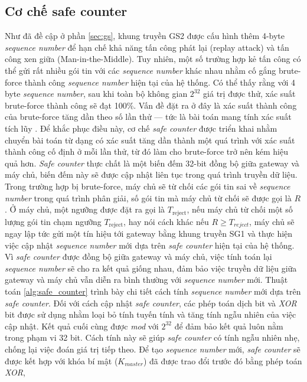 \subsection{Cơ chế safe counter}
\label{sec:safe_counter}
Như đã đề cập ở phần \ref{sec:gs}, khung truyền GS2 được cấu hình thêm 4-byte \textit{sequence number} để hạn chế khả năng tấn công phát lại (replay attack) và tấn công xen giữa (Man-in-the-Middle). Tuy nhiên, một số trường hợp kẻ tấn công có thể gửi rất nhiều gói tin với các \textit{sequence number} khác nhau nhằm cố gắng brute-force thành công \textit{sequence number} hiện tại của hệ thống. Có thể thấy rằng với 4 byte \textit{sequence number}, sau khi toàn bộ không gian $2^{32}$ giá trị được thử, xác suất brute-force thành công sẽ đạt 100\%. Vấn đề đặt ra ở đây là xác suất thành công của brute-force tăng dần theo số lần thử — tức là bài toán mang tính xác suất tích lũy \cite{cumulative}. Để khắc phục điều này, cơ chế \textit{safe counter} được triển khai nhằm chuyển bài toán từ dạng có xác suất tăng dần thành một quá trình với xác suất thành công cố định ở mỗi lần thử, từ đó làm cho brute-force trở nên kém hiệu quả hơn. \textit{Safe counter} thực chất là một biến đếm 32-bit đồng bộ giữa gateway và máy chủ, biến đếm này sẽ được cập nhật liên tục trong quá trình truyền dữ liệu. Trong trường hợp bị brute-force, máy chủ sẽ từ chối các gói tin sai về \textit{sequence number} trong quá trình phân giải, số gói tin mà máy chủ từ chối sẽ được gọi là $R$. Ở máy chủ, một ngưỡng được đặt ra gọi là \(T_{\text{reject}} \), nếu máy chủ từ chối một số lượng gói tin chạm ngưỡng \(T_{\text{reject}} \), hay nói cách khác nếu $R \geq T_{reject}$, máy chủ sẽ ngay lập tức gửi một tín hiệu tới gateway bằng khung truyền SG1 và thực hiện việc cập nhật \textit{sequence number} mới dựa trên \textit{safe counter} hiện tại của hệ thống. Vì \textit{safe counter} được đồng bộ giữa gateway và máy chủ, việc tính toán lại \textit{sequence number} sẽ cho ra kết quả giống nhau, đảm bảo việc truyền dữ liệu giữa gateway và máy chủ vẫn diễn ra bình thường với \textit{sequence number} mới. Thuật toán \ref{alg:safe_counter} trình bày chi tiết cách tính \textit{sequence number} mới dựa trên \textit{safe counter}.
Đối với cách cập nhật \textit{safe counter}, các phép toán dịch bit và \textit{XOR} bit được sử dụng nhằm loại bỏ tính tuyến tính và tăng tính ngẫu nhiên của việc cập nhật. Kết 
quả cuối cùng được \textit{mod} với $2^{32}$ để đảm bảo kết quả luôn nằm trong phạm vi 32 bit. Cách tính này sẽ giúp \textit{safe counter} có tính ngẫu nhiên nhẹ, chống lại
việc đoán giá trị tiếp theo. Để tạo \textit{sequence number} mới, \textit{safe counter} sẽ được kết hợp với khóa bí mật ($K_{master}$) đã được trao đổi trước đó bằng phép toán \textit{XOR},
